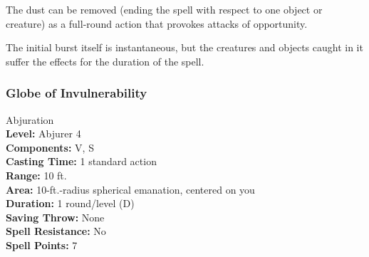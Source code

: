 The dust can be removed (ending the spell with respect to one object or creature) as a full-round action that provokes attacks of opportunity.

The initial burst itself is instantaneous, but the creatures and objects caught in it suffer the effects for the duration of the spell.

%

\subsubsection{Globe of Invulnerability}
\label{Spell:GlobeOfInvulnerability}
Abjuration
\\ \textbf{Level:} Abjurer 4
\\ \textbf{Components:} V, S
\\ \textbf{Casting Time:} 1 standard action
\\ \textbf{Range:} 10 ft.
\\ \textbf{Area:} 10-ft.-radius spherical emanation, centered on you
\\ \textbf{Duration:} 1 round/level (D)
\\ \textbf{Saving Throw:} None
\\ \textbf{Spell Resistance:} No
\\ \textbf{Spell Points:} 7

